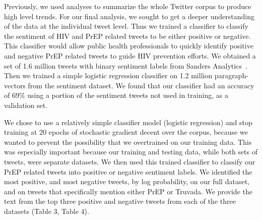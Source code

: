 \documentclass{sig-alternate-05-2015}
\begin{document}
Previously, we used analyses to summarize the whole Twitter corpus to produce high level trends. For our final analysis, we sought to get a deeper understanding of the data at the individual tweet level. Thus we trained a classifier to classify the sentiment of HIV and PrEP related tweets to be either positive or negative. This classifier would allow public health professionals to quickly identify positive and negative PrEP related tweets to guide HIV prevention efforts. We obtained a set of 1.6 million tweets with binary sentiment labels from Sanders Analytics~\cite{sentimentdata}. Then we trained a simple logistic regression classifier on 1.2 million paragraph-vectors from the sentiment dataset. We found that our classifier had an accuracy of 69\% using a portion of the sentiment tweets not used in training, as a validation set.

We chose to use a relatively simple classifier model (logistic regression) and stop training at 20 epochs of stochastic gradient decent over the corpus, because we wanted to prevent the possibility that we overtrained on our training data. This was especially important because our training and testing data, while both sets of tweets, were separate datasets. We then used this trained classifier to classify our PrEP related tweets into positive or negative sentiment labels. We identified the most positive, and most negative tweets, by log probability, on our full dataset, and on tweets that specifically mention either PrEP or Truvada. We provide the text from the top three positive and negative tweets from each of the three datasets (Table 3, Table 4).
\end{document}
